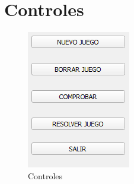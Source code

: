\section{Controles}

\begin{figure}[htbp]
\begin{center}
\includegraphics[width=.40\textwidth]{./imagenes/Controles.png}
\caption{Controles}
\label{Controles}
\end{center}
\end{figure}


